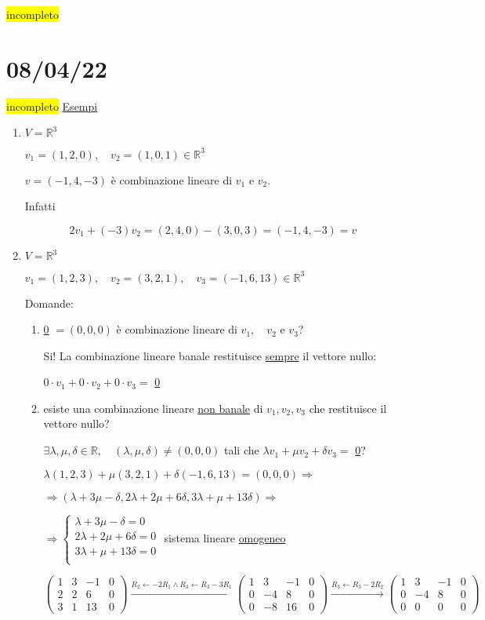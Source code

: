 \documentclass{article}
\newcommand{\hl}[1]{\colorbox{yellow}{#1}}
\newcommand{\ul}[1]{\underline{#1}}
\newcommand{\R}{\mathbb{R}}
\begin{document}
\hl{incompleto}
\section{08/04/22}
\hl{incompleto}
\ul{Esempi}
\begin{enumerate}
	\item $V=\R^3$

	  $v_1=(1,2,0),\quad v_2=(1,0,1)\in\R^3$

	  $v=(-1,4,-3)$ è combinazione lineare di $v_1$ e $v_2$.

	  Infatti

	  $$2v_1+(-3)v_2=(2,4,0)-(3,0,3)=(-1,4,-3)=v$$
	\item $V=\R^3$

	  $v_1=(1,2,3),\quad v_2=(3,2,1),\quad v_3=(-1,6,13)\in\R^3$

	  Domande:
	  \begin{enumerate}
		  \item \ul{0} $=(0,0,0)$ è combinazione lineare di $v_1,\quad v_2$ e $v_3$?

		    Si! La combinazione lineare banale restituisce \ul{sempre} il vettore nullo:

		    $0\cdot v_1+0\cdot v_2+0\cdot v_3=$ \ul{0}

		  \item esiste una combinazione lineare \ul{non banale} di $v_1,v_2,v_3$ che restituisce il vettore nullo?

		    $\exists\lambda,\mu,\delta\in\R,\quad(\lambda,\mu,\delta)\not=(0,0,0)$ tali che $\lambda v_1+\mu v_2+\delta v_3=$ \ul{0}?

		    $\lambda(1,2,3)+\mu(3,2,1)+\delta(-1,6,13)=(0,0,0)\Rightarrow$

		    $\Rightarrow(\lambda+3\mu-\delta,2\lambda+2\mu+6\delta,3\lambda+\mu+13\delta)\Rightarrow$

		    $\Rightarrow
			  \begin{cases}
				  \lambda+3\mu-\delta=0   \\
				  2\lambda+2\mu+6\delta=0 \\
				  3\lambda+\mu+13\delta=0 \\
			  \end{cases}$ sistema lineare \ul{omogeneo}

		    $\begin{pmatrix}
				  1 & 3 & -1 & 0 \\
				  2 & 2 & 6  & 0 \\
				  3 & 1 & 13 & 0
			  \end{pmatrix}\xrightarrow{R_2\leftarrow-2R_1\wedge R_3\leftarrow R_3-3R_1}
			  \begin{pmatrix}
				  1 & 3  & -1 & 0 \\
				  0 & -4 & 8  & 0 \\
				  0 & -8 & 16 & 0
			  \end{pmatrix}\xrightarrow{R_3\leftarrow R_3-2R_2}
			  \begin{pmatrix}
				  1 & 3  & -1 & 0 \\
				  0 & -4 & 8  & 0 \\
				  0 & 0  & 0  & 0
			  \end{pmatrix}$


\end{enumerate}
\end{enumerate}
\end{document}
